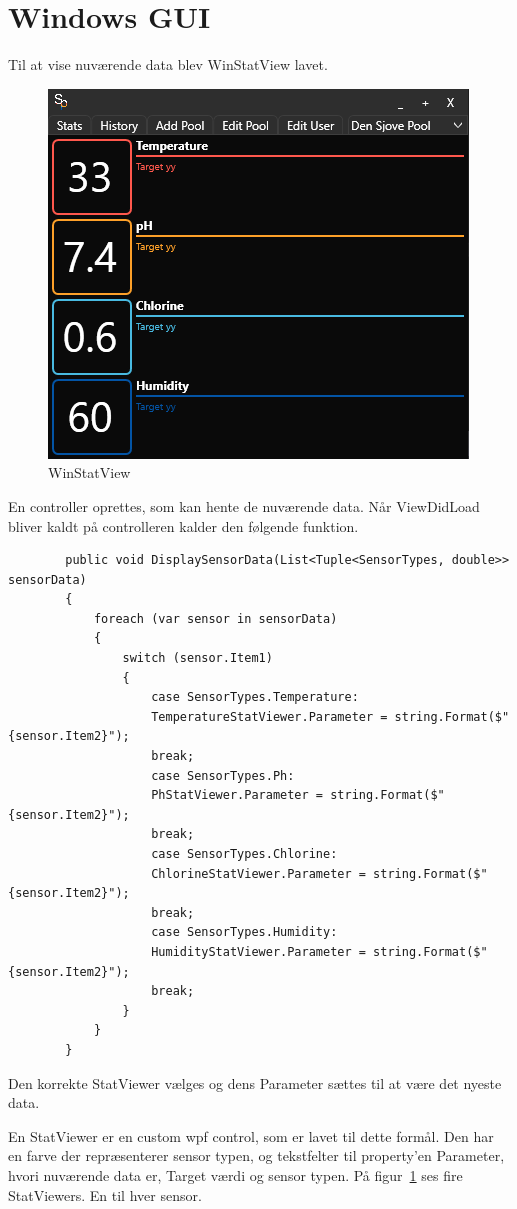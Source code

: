 \usepackage{listings}
\usepackage{xcolor}



\section{Windows GUI}
Til at vise nuværende data blev WinStatView lavet.
\begin{figure}[h]
	\centering
	\includegraphics[width=0.5\linewidth]{figs/implementering/winstatview}
	\caption{WinStatView}
	\label{fig:winstatview}
\end{figure}

En controller oprettes, som kan hente de nuværende data. Når ViewDidLoad bliver kaldt på controlleren kalder den følgende funktion.
\lstset{style=sharpc}
\begin{lstlisting}
        public void DisplaySensorData(List<Tuple<SensorTypes, double>> sensorData)
        {
        	foreach (var sensor in sensorData)
        	{
        		switch (sensor.Item1)
        		{
        			case SensorTypes.Temperature:
        			TemperatureStatViewer.Parameter = string.Format($"{sensor.Item2}");
        			break;
        			case SensorTypes.Ph:
        			PhStatViewer.Parameter = string.Format($"{sensor.Item2}");
        			break;
        			case SensorTypes.Chlorine:
        			ChlorineStatViewer.Parameter = string.Format($"{sensor.Item2}");
        			break;
        			case SensorTypes.Humidity:
        			HumidityStatViewer.Parameter = string.Format($"{sensor.Item2}");
        			break;
        		} 
        	}
        }
\end{lstlisting}
Den korrekte StatViewer vælges og dens Parameter sættes til at være det nyeste data.

En StatViewer er en custom wpf control, som er lavet til dette formål. Den har en farve der repræsenterer sensor typen, og tekstfelter til property'en Parameter, hvori nuværende data er, Target værdi og sensor typen. 
På figur~\ref{fig:winstatview} ses fire StatViewers. En til hver sensor. 

